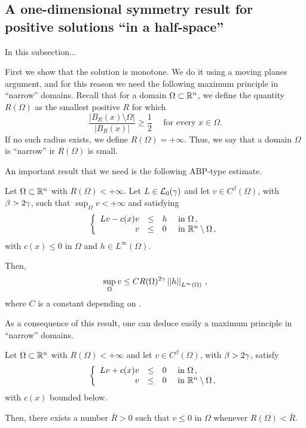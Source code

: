 \subsection{A one-dimensional symmetry result for positive solutions ``in a half-space''} In this subsection...




First we show that the solution is monotone. We do it using a moving planes argument, and for this reason we need the following maximum principle in ``narrow'' domains. Recall that for a domain $\Omega \subset \mathbb{R}^n$, we define the quantity $R(\Omega)$ as the smallest positive $R$ for which
$$
\dfrac{|B_R(x)\setminus \Omega|}{|B_R(x)|}\geq \dfrac{1}{2} \quad \text{ for every } x \in \Omega.
$$
If no such radius exists, we define $R(\Omega) = +\infty$. Thus, we say that a domain $\Omega$ is ``narrow'' ir $R(\Omega)$ is small.


An important result that we need is the following ABP-type estimate. 
\begin{theorem}
	\label{Th:ABPEstimate}
	Let $\Omega \subset \mathbb{R}^n$ with $R(\Omega) < +\infty$. Let $L \in \mathcal{L}_0(\gamma)$ and let $v\in C^{\beta}(\Omega)$, with $\beta > 2\gamma$, such that $\sup_{\Omega} v < +\infty$ and satisfying
	$$
	\left\{\begin{array}{rcll}
	Lv - c(x)v &\leq & h & \text{ in } \Omega\,, \\
	v & \leq & 0 & \text{ in } \mathbb{R}^n\setminus \Omega\,,
	\end{array} \right.
	$$
	with $c(x)\leq 0$ in $\Omega$ and $h\in L^\infty(\Omega)$.
	
	Then,
	$$
	\sup_\Omega v \leq C R(\Omega)^{2\gamma} \left | \left |{h} \right | \right |_{L^{\infty}(\Omega)}\,,
	$$
	where $C$ is a constant depending on .
\end{theorem}

As a consequence of this result, one can deduce easily a maximum principle in ``narrow'' domains.

\begin{corollary}
	\label{Cor:MaxPpleNarrowDomains}
	Let $\Omega \subset \mathbb{R}^n$ with $R(\Omega) < +\infty$ and let $v\in C^{\beta}(\Omega)$, with $\beta > 2\gamma$, satisfy
	$$
	\left\{\begin{array}{rcll}
	Lv + c(x)v &\leq & 0 & \text{ in } \Omega\,, \\
	v & \leq & 0 & \text{ in } \mathbb{R}^n\setminus \Omega\,,
	\end{array} \right.
	$$
	with $c(x)$ bounded below.
	
	Then, there exists a number $\bar{R} > 0$ such that $v \leq 0$ in $\Omega$ whenever $R(\Omega)< \bar{R}$.
	
\end{corollary}


